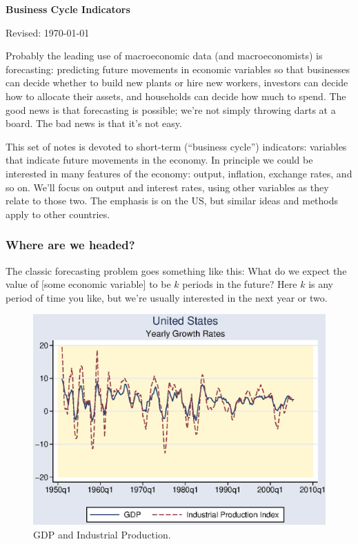 \documentclass[letterpaper,12pt]{article}
\def\HeadName{Business Cycle Indicators}
\begin{document}
\thispagestyle{empty}%
\Head

\centerline{\large \bf \HeadName}%
\centerline{Revised: \today}

\bigskip
Probably the leading use of macroeconomic data (and macroeconomists) is forecasting:  predicting
future movements in economic variables so that businesses can decide whether to build new plants
or hire new workers, investors can decide how to allocate their assets, and households can decide
how much to spend. The good news is that forecasting is possible;  
we're not simply throwing darts at a board.  
The bad news is that it's not easy.


This set of notes is devoted to short-term (``business cycle'')
indicators:  variables that indicate future movements in the
economy.  In principle we could be interested in many features of
the economy:  output, inflation, exchange rates, and so on. We'll
focus on output and interest rates, using other variables as they
relate to those two. The emphasis is on the US, but similar ideas
and methods apply to other countries.


\subsubsection*{Where are we headed?}

The classic forecasting problem goes something like this:  What do we expect the value of [some
economic variable] to be $k$ periods in the future?  Here $k$ is any period of time you like, but
we're usually interested in the next year or two.

\begin{figure}
    \centering
    \includegraphics[scale=0.8]{us_gdp_indprod.eps}
    \caption{GDP and Industrial Production.}
    \label{fig:ip_gdp}%
\end{figure}
\end{document}
